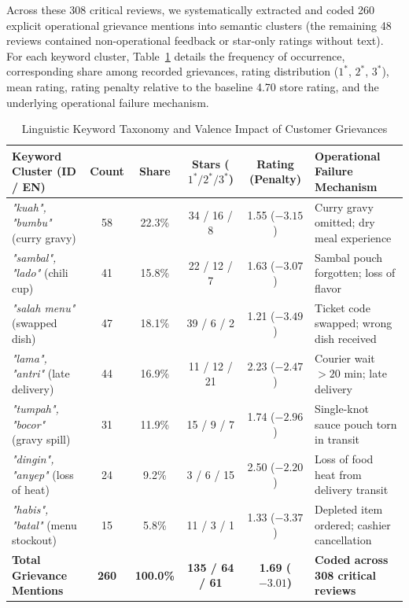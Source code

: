\documentclass{jomas}
\begin{document}
Across these 308 critical reviews, we systematically extracted and coded 260 explicit operational grievance mentions into semantic clusters (the remaining 48 reviews contained non-operational feedback or star-only ratings without text). For each keyword cluster, Table~\ref{tab:linguistic-taxonomy} details the frequency of occurrence, corresponding share among recorded grievances, rating distribution ($1^*$, $2^*$, $3^*$), mean rating, rating penalty relative to the baseline 4.70 store rating, and the underlying operational failure mechanism.

\begin{table}[H]
\caption{Linguistic Keyword Taxonomy and Valence Impact of Customer Grievances}
\label{tab:linguistic-taxonomy}
\centering
\small
\setlength{\tabcolsep}{4.5pt}
\begin{tabularx}{\textwidth}{p{4.2cm} c c c c X}
\toprule
\textbf{Keyword Cluster (ID / EN)} & \textbf{Count} & \textbf{Share} & \textbf{Stars ($1^*/2^*/3^*$)} & \textbf{Rating (Penalty)} & \textbf{Operational Failure Mechanism} \\
\midrule
\textit{"kuah", "bumbu"} (curry gravy) & 58 & 22.3\% & 34 / 16 / 8 & 1.55 ($-3.15$) & Curry gravy omitted; dry meal experience \\
\textit{"sambal", "lado"} (chili cup) & 41 & 15.8\% & 22 / 12 / 7 & 1.63 ($-3.07$) & Sambal pouch forgotten; loss of flavor \\
\textit{"salah menu"} (swapped dish) & 47 & 18.1\% & 39 / 6 / 2 & 1.21 ($-3.49$) & Ticket code swapped; wrong dish received \\
\textit{"lama", "antri"} (late delivery) & 44 & 16.9\% & 11 / 12 / 21 & 2.23 ($-2.47$) & Courier wait $>20$ min; late delivery \\
\textit{"tumpah", "bocor"} (gravy spill) & 31 & 11.9\% & 15 / 9 / 7 & 1.74 ($-2.96$) & Single-knot sauce pouch torn in transit \\
\textit{"dingin", "anyep"} (loss of heat) & 24 & 9.2\% & 3 / 6 / 15 & 2.50 ($-2.20$) & Loss of food heat from delivery transit \\
\textit{"habis", "batal"} (menu stockout) & 15 & 5.8\% & 11 / 3 / 1 & 1.33 ($-3.37$) & Depleted item ordered; cashier cancellation \\
\midrule
\textbf{Total Grievance Mentions} & \textbf{260} & \textbf{100.0\%} & \textbf{135 / 64 / 61} & \textbf{1.69 ($-3.01$)} & \textbf{Coded across 308 critical reviews} \\
\bottomrule
\end{tabularx}
\end{table}
\end{document}
